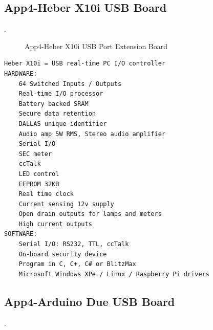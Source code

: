 \subsection{App4-Heber X10i USB Board}.

\begin{figure}[htbp]
	\begin{center}
		\caption{App4-Heber X10i USB Port Extension Board}
		\label{fig:App4-Captured-Heber-X10i-USB-Extension-Board.jpg}
	\end{center}
\end{figure}


\lstset{basicstyle=\ttfamily\small}
\begin{lstlisting}[breaklines, frame=single, caption={App4-Specifications of Heber-X10i USB Interface Board}, label=App4-Specifications-Heber-X10i-USB-Interface-Board]
Heber X10i = USB real-time PC I/O controller
HARDWARE:
	64 Switched Inputs / Outputs
	Real-time I/O processor
	Battery backed SRAM
	Secure data retention
	DALLAS unique identifier
	Audio amp 5W RMS, Stereo audio amplifier
	Serial I/O
	SEC meter
	ccTalk
	LED control
	EEPROM 32KB
	Real time clock
	Current sensing 12v supply
	Open drain outputs for lamps and meters
	High current outputs
SOFTWARE:
	Serial I/O: RS232, TTL, ccTalk
	On-board security device
	Program in C, C+, C# or BlitzMax
	Microsoft Windows XPe / Linux / Raspberry Pi drivers
\end{lstlisting}

\clearpage
\pagebreak		
		
\subsection{App4-Arduino Due USB Board}. 

